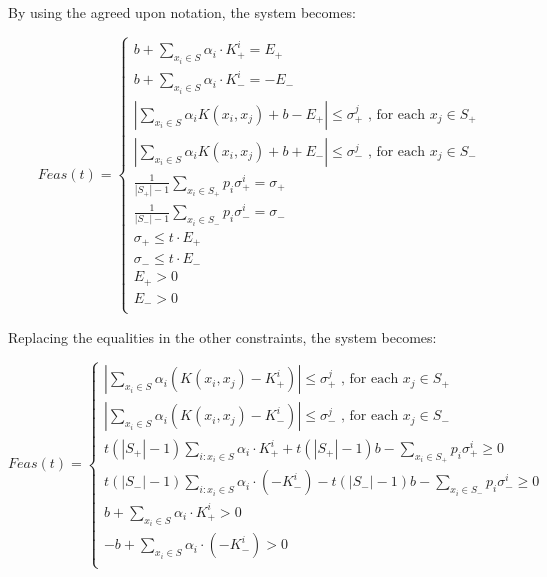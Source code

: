 \documentclass[a4paper,twoside,10pt]{report}
\begin{document}
	By using the agreed upon notation, the system becomes:
	
	\[
		Feas(t) = \left\{
		\begin{array}{l}			
				b + \sum_{x_i\in S} {\alpha_i \cdot K^i_+} = E_+\\
				b + \sum_{x_i\in S} {\alpha_i \cdot K^i_-} = -E_-\\
				
				|\sum_{x_i\in S} {\alpha_i K(x_i, x_j)} + b - E_+| \leq \sigma^j_+ \mbox{ , for each } x_j \in S_+\\
				|\sum_{x_i\in S} {\alpha_i K(x_i, x_j)} + b + E_-| \leq \sigma^j_- \mbox{ , for each } x_j \in S_-\\
					
				\frac{1}{|S_+| - 1} \sum_{x_i\in S_+} {p_i \sigma_+^i} = {\sigma_+} \\
				\frac{1}{|S_-| - 1} \sum_{x_i\in S_-} {p_i \sigma_-^i} = {\sigma_-} \\
				
				\sigma_+ \leq t \cdot E_+\\
				\sigma_- \leq t \cdot E_-\\
				E_+ > 0\\
				E_- > 0\\
		\end{array}
		\right. \label{feas_weight_2}
	\]	
	
	
	Replacing the equalities in the other constraints, the system becomes:
 

	\[
		Feas(t) = \left\{
		\begin{array}{l}			
							
				|\sum_{x_i\in S} {\alpha_i (K(x_i, x_j) - K^i_+)}| \leq \sigma^j_+ \mbox{ , for each } x_j \in S_+\\
				|\sum_{x_i\in S} {\alpha_i (K(x_i, x_j) - K^i_-)}| \leq \sigma^j_- \mbox{ , for each } x_j \in S_-\\
									
				t(|S_+| - 1)\sum_{i : x_i \in S}{\alpha_i \cdot K^i_+} + t(|S_+| - 1)b - \sum_{x_i\in S_+}{p_i \sigma^i_+} \geq 0\\
				t(|S_-| - 1)\sum_{i : x_i \in S}{\alpha_i \cdot (-K^i_-)} - t(|S_-| - 1)b - \sum_{x_i\in S_-}{p_i \sigma^i_-} \geq 0\\								
				
				b + \sum_{x_i\in S} {\alpha_i \cdot K^i_+} > 0\\
				-b + \sum_{x_i\in S} {\alpha_i \cdot (-K^i_-)} > 0\\				
		\end{array}
		\right. \label{feas_weight_3}
	\]	
	
\end{document}
